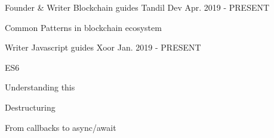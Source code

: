 


\begin{cventries}


\cventry
{Founder \& Writer} %
{Blockchain guides} %
{Tandil Dev} %
{Apr. 2019 - PRESENT} %
{ %
\begin{cvitems}
\item {Common Patterns in blockchain ecosystem}
\end{cvitems}
}


\cventry
{Writer} %
{Javascript guides} %
{Xoor} %
{Jan. 2019 - PRESENT} %
{ %
\begin{cvitems}
\item {ES6}
\item {Understanding this}
\item {Destructuring}
\item {From callbacks to async/await}
\end{cvitems}
}

\end{cventries}
